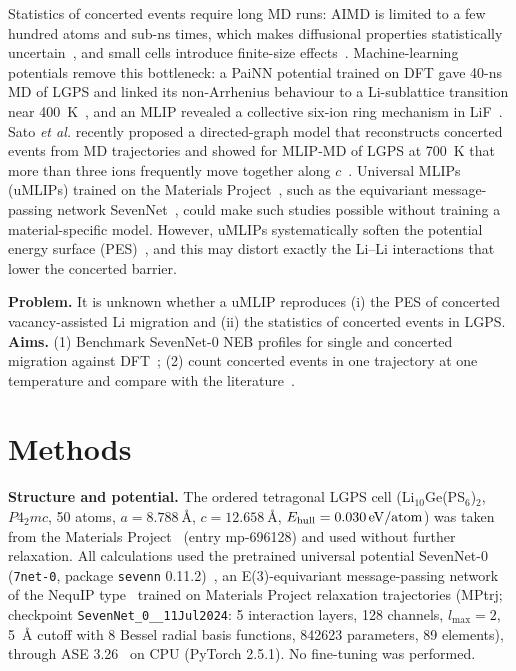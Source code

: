 \documentclass[11pt,a4paper]{article}
\begin{document}
Statistics of concerted events require long MD runs: AIMD is limited to a few hundred atoms and sub-ns times, which makes diffusional properties statistically uncertain~\cite{He2018}, and small cells introduce finite-size effects~\cite{Grasselli2022}. Machine-learning potentials remove this bottleneck: a PaiNN potential trained on DFT gave 40-ns MD of LGPS and linked its non-Arrhenius behaviour to a Li-sublattice transition near \SI{400}{K}~\cite{Winter2023}, and an MLIP revealed a collective six-ion ring mechanism in LiF~\cite{DeAngelis2026}. Sato \textit{et al.} recently proposed a directed-graph model that reconstructs concerted events from MD trajectories and showed for MLIP-MD of LGPS at \SI{700}{K} that more than three ions frequently move together along $c$~\cite{Sato2026}. Universal MLIPs (uMLIPs) trained on the Materials Project~\cite{Jain2013}, such as the equivariant message-passing network SevenNet~\cite{Park2024,Batzner2022,Schutt2018}, could make such studies possible without training a material-specific model. However, uMLIPs systematically soften the potential energy surface (PES)~\cite{Deng2025}, and this may distort exactly the Li--Li interactions that lower the concerted barrier.

\textbf{Problem.} It is unknown whether a uMLIP reproduces (i) the PES of concerted vacancy-assisted Li migration and (ii) the statistics of concerted events in LGPS. \textbf{Aims.} (1) Benchmark SevenNet-0 NEB profiles for single and concerted migration against DFT~\cite{He2017}; (2) count concerted events in one trajectory at one temperature and compare with the literature~\cite{He2017,Sato2026}.

\section{Methods}
\textbf{Structure and potential.} The ordered tetragonal LGPS cell (Li$_{10}$Ge(PS$_6$)$_2$, $P4_2mc$, 50 atoms, $a=\SI{8.788}{\angstrom}$, $c=\SI{12.658}{\angstrom}$, $E_{\rm hull}=\SI{0.030}{eV/atom}$) was taken from the Materials Project~\cite{Jain2013} (entry mp-696128) and used without further relaxation. All calculations used the pretrained universal potential SevenNet-0 (\texttt{7net-0}, package \texttt{sevenn} 0.11.2)~\cite{Park2024}, an E(3)-equivariant message-passing network of the NequIP type~\cite{Batzner2022} trained on Materials Project relaxation trajectories (MPtrj; checkpoint \texttt{SevenNet\_0\_\_11Jul2024}: 5 interaction layers, 128 channels, $l_{\max}=2$, \SI{5}{\angstrom} cutoff with 8 Bessel radial basis functions, \num{842623} parameters, 89 elements), through ASE 3.26~\cite{Larsen2017} on CPU (PyTorch 2.5.1). No fine-tuning was performed.
\end{document}
